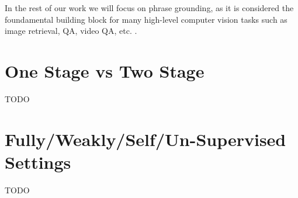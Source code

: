 In the rest of our work we will focus on phrase grounding, as it is considered the foundamental building block for many high-level computer vision tasks such as image retrieval, QA, video QA, etc. .

\cite{conser2019revisiting} 

\section{One Stage vs Two Stage}

TODO

\section{Fully/Weakly/Self/Un-Supervised Settings}

TODO
